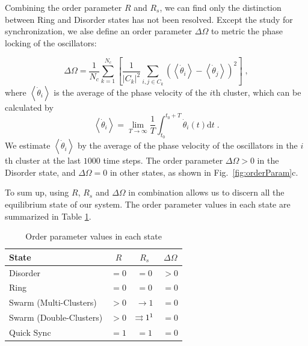 \documentclass[%
 aip,
 amsmath,amssymb,
 reprint,%
]{revtex4-1}
\begin{document}
Combining the order parameter $R$ and $R_s$, we can find only the distinction between Ring and Disorder states has not been resolved. Except the study for synchronization, we alse define an order parameter $\Delta \Omega$ to metric the phase locking of the oscillators:

\begin{equation}
    \Delta \Omega =\frac{1}{N_c}\sum_{k=1}^{N_c}{\left[ \frac{1}{\left| C_k \right|^2}\sum_{i,j\in C_k}{\left( \left< \dot{\theta}_i \right> -\left< \dot{\theta}_j \right> \right) ^2} \right]}\;,
\end{equation}
where $\left< \dot{\theta}_i \right>$ is the average of the phase velocity of the $i$th cluster, which can be calculated by
\begin{equation}
    \left< \dot{\theta}_i \right> =\lim_{T\rightarrow \infty} \frac{1}{T}\int_{t_0}^{t_0+T}{\dot{\theta}_i\left( t \right) \mathrm{d}t}\;.
\end{equation}
We estimate $\left< \dot{\theta}_i \right>$ by the average of the phase velocity of the oscillators in the $i$th cluster at the last $1000$ time steps. 
The order parameter $\Delta \Omega > 0$ in the Disorder state, and $\Delta \Omega = 0$ in other states, as shown in Fig.~\ref{fig:orderParam}c.

To sum up, using $R$, $R_s$ and $\Delta \Omega$ in combination allows us to discern all the equilibrium state of our system.
The order parameter values in each state are summarized in Table \ref{tab:orderParam}.

\begin{table}
    \caption{\label{tab:orderParam} Order parameter values in each state 
    }
    \begin{ruledtabular}
        \begin{tabular}{lccc}
        State& $R$ & $R_s$ & $\Delta\Omega$ \\
        \hline
        Disorder&$=0$&$=0$&$> 0$\\
        Ring&$=0$&$=0$&$=0$\\
        Swarm (Multi-Clusters)&$> 0$&$\rightarrow 1$\footnotemark[1]&$=0$\\
        Swarm (Double-Clusters)&$> 0$&$\rightrightarrows 1\footnotemark[1]$&$=0$\\
        Quick Sync&$=1$&$=1$&$=0$\\
        \end{tabular}
    \end{ruledtabular}
\end{table}
\end{document}
